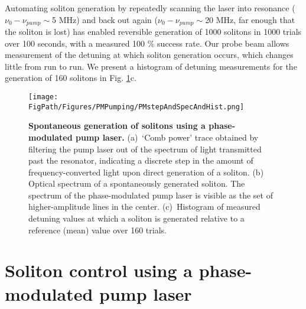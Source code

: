 Automating soliton generation by repeatedly scanning the laser into resonance ($\nu_0-\nu_{pump}\sim$5 MHz) and back out again ($\nu_0-\nu_{pump}\sim$20 MHz, far enough that the soliton is lost) has enabled reversible generation of 1000 solitons in 1000 trials over 100 seconds, with a measured 100 $\%$ success rate. Our probe beam allows measurement of the detuning at which soliton generation occurs, which changes little from run to run. We present a histogram of detuning measurements for the generation of 160 solitons in Fig. \ref{fig:PMgen}c. 

\begin{figure}[htpb]
	\begin{center}
		\texttt{[image: \\FigPath/Figures/PMPumping/PMstepAndSpecAndHist.png]}
	\end{center}
	\caption[Spontaneous generation of solitons using a phase-modulated pump laser]{\textbf{Spontaneous generation of solitons using a phase-modulated pump laser.} (a)~`Comb power' trace obtained by filtering the pump laser out of the spectrum of light transmitted past the resonator, indicating a discrete step in the amount of frequency-converted light upon direct generation of a soliton. (b) Optical spectrum of a spontaneously generated soliton. The spectrum of the phase-modulated pump laser is visible as the set of higher-amplitude lines in the center. (c)~Histogram of measured detuning values at which a soliton is generated relative to a reference (mean) value over 160 trials.}
	\label{fig:PMgen}
\end{figure} 

\section{Soliton control using a phase-modulated pump laser}

